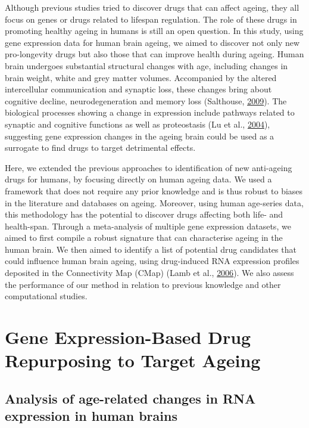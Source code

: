\documentclass[12pt,twoside]{unicam}
\begin{document}
Although previous studies tried to discover drugs that can affect ageing, they all focus on genes or drugs related to lifespan regulation. The role of these drugs in promoting healthy ageing in humans is still an open question. In this study, using gene expression data for human brain ageing, we aimed to discover not only new pro-longevity drugs but also those that can improve health during ageing. Human brain undergoes substantial structural changes with age, including changes in brain weight, white and grey matter volumes. Accompanied by the altered intercellular communication and synaptic loss, these changes bring about cognitive decline, neurodegeneration and memory loss (Salthouse, \protect\hyperlink{ref-Salthouse2009}{2009}). The biological processes showing a change in expression include pathways related to synaptic and cognitive functions as well as proteostasis (Lu et al., \protect\hyperlink{ref-Lu2004}{2004}), suggesting gene expression changes in the ageing brain could be used as a surrogate to find drugs to target detrimental effects.

Here, we extended the previous approaches to identification of new anti-ageing drugs for humans, by focusing directly on human ageing data. We used a framework that does not require any prior knowledge and is thus robust to biases in the literature and databases on ageing. Moreover, using human age-series data, this methodology has the potential to discover drugs affecting both life- and health-span. Through a meta-analysis of multiple gene expression datasets, we aimed to first compile a robust signature that can characterise ageing in the human brain. We then aimed to identify a list of potential drug candidates that could influence human brain ageing, using drug-induced RNA expression profiles deposited in the Connectivity Map (CMap) (Lamb et al., \protect\hyperlink{ref-Lamb2006}{2006}). We also assess the performance of our method in relation to previous knowledge and other computational studies.

\hypertarget{drugstudy}{%
\section{Gene Expression-Based Drug Repurposing to Target Ageing}\label{drugstudy}}

\hypertarget{ArrayChangesAgeing}{%
\subsection{Analysis of age-related changes in RNA expression in human brains}\label{ArrayChangesAgeing}}
\end{document}
